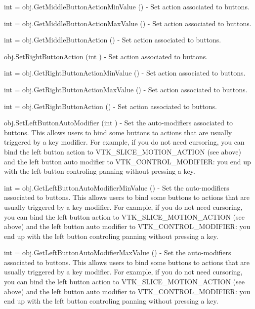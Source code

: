\begin{DoxyItemize}
\item {\ttfamily int = obj.\-Get\-Middle\-Button\-Action\-Min\-Value ()} -\/ Set action associated to buttons.  
\item {\ttfamily int = obj.\-Get\-Middle\-Button\-Action\-Max\-Value ()} -\/ Set action associated to buttons.  
\item {\ttfamily int = obj.\-Get\-Middle\-Button\-Action ()} -\/ Set action associated to buttons.  
\item {\ttfamily obj.\-Set\-Right\-Button\-Action (int )} -\/ Set action associated to buttons.  
\item {\ttfamily int = obj.\-Get\-Right\-Button\-Action\-Min\-Value ()} -\/ Set action associated to buttons.  
\item {\ttfamily int = obj.\-Get\-Right\-Button\-Action\-Max\-Value ()} -\/ Set action associated to buttons.  
\item {\ttfamily int = obj.\-Get\-Right\-Button\-Action ()} -\/ Set action associated to buttons.  
\item {\ttfamily obj.\-Set\-Left\-Button\-Auto\-Modifier (int )} -\/ Set the auto-\/modifiers associated to buttons. This allows users to bind some buttons to actions that are usually triggered by a key modifier. For example, if you do not need cursoring, you can bind the left button action to V\-T\-K\-\_\-\-S\-L\-I\-C\-E\-\_\-\-M\-O\-T\-I\-O\-N\-\_\-\-A\-C\-T\-I\-O\-N (see above) and the left button auto modifier to V\-T\-K\-\_\-\-C\-O\-N\-T\-R\-O\-L\-\_\-\-M\-O\-D\-I\-F\-I\-E\-R\-: you end up with the left button controling panning without pressing a key.  
\item {\ttfamily int = obj.\-Get\-Left\-Button\-Auto\-Modifier\-Min\-Value ()} -\/ Set the auto-\/modifiers associated to buttons. This allows users to bind some buttons to actions that are usually triggered by a key modifier. For example, if you do not need cursoring, you can bind the left button action to V\-T\-K\-\_\-\-S\-L\-I\-C\-E\-\_\-\-M\-O\-T\-I\-O\-N\-\_\-\-A\-C\-T\-I\-O\-N (see above) and the left button auto modifier to V\-T\-K\-\_\-\-C\-O\-N\-T\-R\-O\-L\-\_\-\-M\-O\-D\-I\-F\-I\-E\-R\-: you end up with the left button controling panning without pressing a key.  
\item {\ttfamily int = obj.\-Get\-Left\-Button\-Auto\-Modifier\-Max\-Value ()} -\/ Set the auto-\/modifiers associated to buttons. This allows users to bind some buttons to actions that are usually triggered by a key modifier. For example, if you do not need cursoring, you can bind the left button action to V\-T\-K\-\_\-\-S\-L\-I\-C\-E\-\_\-\-M\-O\-T\-I\-O\-N\-\_\-\-A\-C\-T\-I\-O\-N (see above) and the left button auto modifier to V\-T\-K\-\_\-\-C\-O\-N\-T\-R\-O\-L\-\_\-\-M\-O\-D\-I\-F\-I\-E\-R\-: you end up with the left button controling panning without pressing a key.  

\end{DoxyItemize}
